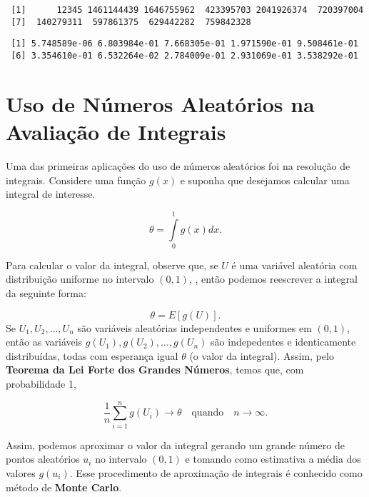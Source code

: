 \documentclass[
  letterpaper,
  DIV=11,
  numbers=noendperiod]{scrreprt}
\newenvironment{Shaded}{\begin{snugshade}}{\end{snugshade}}
\newcommand{\NormalTok}[1]{\textcolor[rgb]{0.00,0.23,0.31}{#1}}
\newcommand{\SpecialCharTok}[1]{\textcolor[rgb]{0.37,0.37,0.37}{#1}}
\begin{document}
\begin{verbatim}
 [1]      12345 1461144439 1646755962  423395703 2041926374  720397004
 [7]  140279311  597861375  629442282  759842328
\end{verbatim}

\begin{Shaded}
\end{Shaded}

\begin{verbatim}
 [1] 5.748589e-06 6.803984e-01 7.668305e-01 1.971590e-01 9.508461e-01
 [6] 3.354610e-01 6.532264e-02 2.784009e-01 2.931069e-01 3.538292e-01
\end{verbatim}

\section{Uso de Números Aleatórios na Avaliação de
Integrais}\label{uso-de-nuxfameros-aleatuxf3rios-na-avaliauxe7uxe3o-de-integrais}

Uma das primeiras aplicações do uso de números aleatórios foi na
resolução de integrais. Considere uma função \(g(x)\) e suponha que
desejamos calcular uma integral de interesse.

\[\theta = \int\limits_{0}^{1}g(x) dx.\]

Para calcular o valor da integral, observe que, se \(U\) é uma variável
aleatória com distribuição uniforme no intervalo \((0, 1)\), , então
podemos reescrever a integral da seguinte forma:

\[\theta = E[g(U)].\] Se \(U_1, U_2, \dots,  U_n\) são variáveis
aleatórias independentes e uniformes em \((0, 1)\), então as variáveis
\(g(U_1), g(U_2), \dots,  g(U_n)\) são indepedentes e identicamente
distribuídas, todas com esperança igual \(\theta\) (o valor da
integral). Assim, pelo \textbf{Teorema da Lei Forte dos Grandes
Números}, temos que, com probabilidade 1,

\[\frac{1}{n}\sum\limits_{i=1}^{n}g(U_i) \to \theta \quad \text{quando} \quad n \to \infty.\]

Assim, podemos aproximar o valor da integral gerando um grande número de
pontos aleatórios \(u_i\) no intervalo \((0, 1)\) e tomando como
estimativa a média dos valores \(g(u_i)\). Esse procedimento de
aproximação de integrais é conhecido como método de \textbf{Monte
Carlo}.
\end{document}

